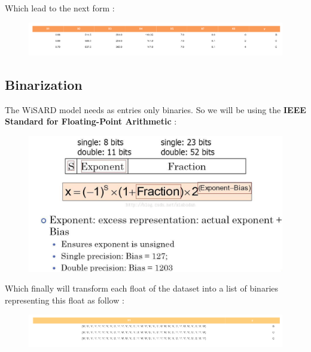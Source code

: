 \documentclass[a4paper, 11pt]{article}
\begin{document}
Which lead to the next form :
\begin{figure}[H]
\begin{center}
  \includegraphics[width=\linewidth]{../figures_trabalho_final/step_df_classif.png}
\end{center}
\end{figure}

\subsection{Binarization}
The WiSARD model needs as entries only binaries.
So we will be using the \textbf{IEEE Standard for Floating-Point
Arithmetic} :
\begin{figure}[H]
\begin{center}
  \includegraphics[width=0.8\linewidth]{../figures_trabalho_final/IEEE.jpg}
\end{center}
\end{figure}

Which finally will transform each float of the dataset into a list of binaries
representing this float as follow :
\begin{figure}[H]
\begin{center}
  \includegraphics[width=\linewidth]{../figures_trabalho_final/step_df_bin_classif.png}
\end{center}
\end{figure}
\end{document}
